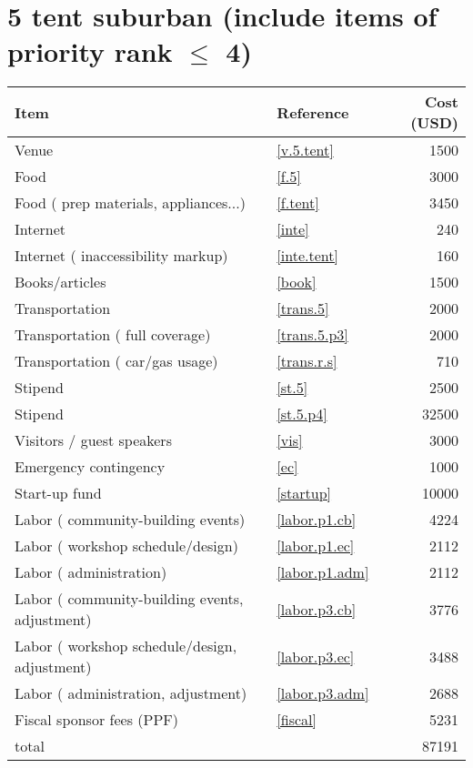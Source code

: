 \section*{5 tent suburban (include items of priority rank $\leq$ 4)}
\begin{center}
\begin{tabular}{llr}
Item & Reference & Cost (USD) \\ \hline
Venue & \ref{v.5.tent} & 1500 \\
Food & \ref{f.5} & 3000 \\
Food ( prep materials, appliances...) & \ref{f.tent} & 3450 \\
Internet & \ref{inte} & 240 \\
Internet ( inaccessibility markup) & \ref{inte.tent} & 160 \\
Books/articles & \ref{book} & 1500 \\
Transportation & \ref{trans.5} & 2000 \\
Transportation ( full coverage) & \ref{trans.5.p3} & 2000 \\
Transportation ( car/gas usage) & \ref{trans.r.s} & 710 \\
Stipend & \ref{st.5} & 2500 \\
Stipend & \ref{st.5.p4} & 32500 \\
Visitors / guest speakers & \ref{vis} & 3000 \\
Emergency contingency & \ref{ec} & 1000 \\
Start-up fund & \ref{startup} & 10000 \\
Labor ( community-building events) & \ref{labor.p1.cb} & 4224 \\
Labor ( workshop schedule/design) & \ref{labor.p1.ec} & 2112 \\
Labor ( administration) & \ref{labor.p1.adm} & 2112 \\
Labor ( community-building events, adjustment) & \ref{labor.p3.cb} & 3776 \\
Labor ( workshop schedule/design, adjustment) & \ref{labor.p3.ec} & 3488 \\
Labor ( administration, adjustment) & \ref{labor.p3.adm} & 2688 \\
Fiscal sponsor fees (PPF) & \ref{fiscal} & 5231 \\ \hline
total &  & 87191
\end{tabular}
\end{center}
\newpage
